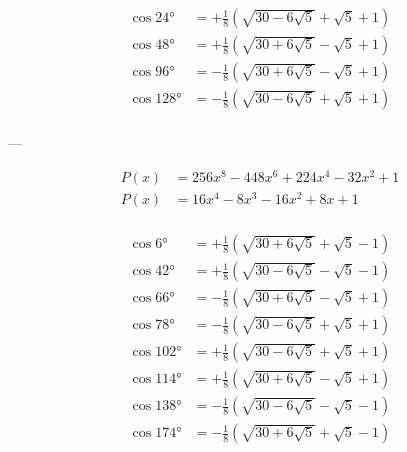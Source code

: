 $$
\begin{aligned}
    \cos 24°  &= +\frac{1}{8} \left(\sqrt{30-6\sqrt{5}}+\sqrt{5}+1\right)\\
    \cos 48°  &= +\frac{1}{8} \left(\sqrt{30+6\sqrt{5}}-\sqrt{5}+1\right)\\
    \cos 96°  &= -\frac{1}{8} \left(\sqrt{30+6\sqrt{5}}-\sqrt{5}+1\right)\\
    \cos 128° &= -\frac{1}{8} \left(\sqrt{30-6\sqrt{5}}+\sqrt{5}+1\right)\\
\end{aligned}
$$

---

$$
\begin{aligned}
    P(x) &= 256 x^8-448 x^6+224 x^4-32 x^2+1\\
    P(x) &= 16 x^4-8 x^3-16 x^2+8 x+1\\
\end{aligned}
$$

$$
\begin{aligned}
    \cos 6°   &= +\frac{1}{8} \left(\sqrt{30+6\sqrt{5}}+\sqrt{5}-1\right)\\
    \cos 42°  &= +\frac{1}{8} \left(\sqrt{30-6\sqrt{5}}-\sqrt{5}-1\right)\\
    \cos 66°  &= -\frac{1}{8} \left(\sqrt{30+6\sqrt{5}}-\sqrt{5}+1\right)\\
    \cos 78°  &= -\frac{1}{8} \left(\sqrt{30-6\sqrt{5}}+\sqrt{5}+1\right)\\
    \cos 102° &= +\frac{1}{8} \left(\sqrt{30-6\sqrt{5}}+\sqrt{5}+1\right)\\
    \cos 114° &= +\frac{1}{8} \left(\sqrt{30+6\sqrt{5}}-\sqrt{5}+1\right)\\
    \cos 138° &= -\frac{1}{8} \left(\sqrt{30-6\sqrt{5}}-\sqrt{5}-1\right)\\
    \cos 174° &= -\frac{1}{8} \left(\sqrt{30+6\sqrt{5}}+\sqrt{5}-1\right)\\
\end{aligned}
$$